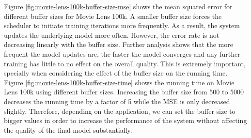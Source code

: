 \documentclass{vldb}
\begin{document}
Figure \ref{fig:movie-lens-100k-buffer-size-mse} shows the mean squared error for different buffer sizes for Movie Lens 100k. 
A smaller buffer size forces the scheduler to initiate training iterations more frequently.
As a result, the system updates the underlying model more often.
However, the error rate is not decreasing linearly with the buffer size.
Further analysis shows that the more frequent the model updates are, the faster the model converges and any further training has little to no effect on the overall quality.
This is extremely important, specially when considering the effect of the buffer size on the running time.
Figure \ref{fig:movie-lens-100k-buffer-size-time} shows the running time on Movie Lens 100k using different buffer sizes. 
Increasing the buffer size from 500 to 5000 decreases the running time by a factor of 5 while the MSE is only decreased slightly.
Therefore, depending on the application, we can set the buffer size to bigger values in order to increase the performance of the system without affecting the quality of the final model substantially.
\end{document}
